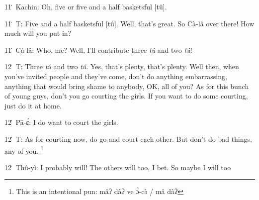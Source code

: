 11\. Kachin: Oh, five or five and a half basketsful [tû].

11\. T: Five and a half basketsful [tû].  Well, that's great.  So Cà-lâ over
there!  How much will you put in?

11\. Cà-lâ: Who, me?  Well, I'll contribute three \textit{tû }and two \textit{tû}!

12\. T: Three \textit{tû }and two \textit{tû}.  Yes, that's plenty, that's plenty.
Well then, when you've invited people and they've come, don't do anything embarrassing,
anything that would bring shame to anybody, OK, all of you?  As for this bunch
of young guys, don't you go courting the girls.  If you want to do some courting,
just do it at home.

12\. Pā-ɛ́: I do want to court the girls.

12\. T: As for courting now, do go and court each other.  But don't do bad things,
any of you. \footnote{This is an intentional pun: mâʔ   dàʔ   ve  ɔ̀-cə̀ /   mâ  dàʔ}

12\. Thû-yì: I probably will!  The others will too, I bet.  So maybe I will too
